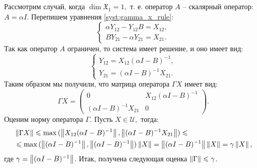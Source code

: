 Рассмотрим случай, когда $\dim\mathfrak{X}_1 = 1,$ т.\! е. оператор $A$ -- скалярный оператор: $A = \alpha I.$ Перепишем уравнения \ref{syst:gamma_x_rule}:
$$
	\begin{cases}
		\alpha Y_{12} - Y_{12}B = X_{12}, \\
		BY_{21} - \alpha Y_{21} = X_{21}.
	\end{cases}
$$
Так как оператор $A$ ограничен, то система имеет решение, и оно имеет вид:
$$
	\begin{cases}
		Y_{12} = X_{12}(\alpha I - B)^{-1}, \\
		Y_{21} = (\alpha I - B)^{-1}X_{21}.
	\end{cases}
$$
Таким образом мы получили, что матрица оператора $\Gamma X$ имеет вид:
$$
	\Gamma X = \begin{pmatrix}
		0 & X_{12}(\alpha I - B)^{-1} \\
		(\alpha I - B)^{-1}X_{21} & 0
	\end{pmatrix}.
$$
Оценим норму оператора $\Gamma.$ Пусть $X \in \mathcal{U},$ тогда:
\begin{align*}
&\left\|\Gamma X\right\| \leqslant \max{(\left\|X_{12}(\alpha I - B)^{-1}\right\|, \left\|(\alpha I - B)^{-1}X_{21}\right\|)} \leqslant \\ 
&\leqslant \max{(\left\|(\alpha I - B)^{-1}\right\|, \left\|(\alpha I - B)^{-1}\right\|)}\left\|X\right\| = \left\|(\alpha I - B)^{-1}\right\|\left\|X\right\| = \gamma \left\|X\right\|,
\end{align*}  
где $\gamma = \left\|(\alpha I - B)^{-1}\right\|$.
Итак, получена следующая оценка $\left\|\Gamma\right\| \leqslant \gamma$.